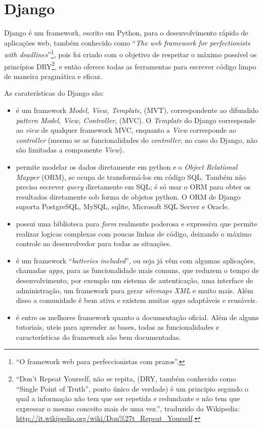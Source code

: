 \section{Django}\label{django}
Django é um framework, escrito em Python, para o desenvolvimento
rápido de aplicações web, também conhecido como ``\emph{The web
  framework for perfectionists with deadlines}''\footnote{``O
  framework web para perfeccionistas com prazos''.}, pois foi criado
com o objetivo de respeitar o máximo possível os princípios
DRY\footnote{``Don't Repeat Yourself, não se repita, (DRY, também
  conhecido como ``Single Point of Truth'', ponto único de verdade) é
  um principio segundo o qual a informação não tem que ser repetida e
  redundante e não tem que expressar o mesmo conceito mais de uma
  vez.'', traduzido do Wikipedia:
  \url{http://it.wikipedia.org/wiki/Don\%27t_Repeat_Yourself}.}, e
então oferece todas as ferramentas para escrever código limpo de
maneira pragmática e eficaz.

As caraterísticas do Django são:
\begin{itemize}
\item é um framework \emph{Model, View, Template}, (MVT),
  correspondente ao difundido \emph{pattern Model, View, Controller},
  (MVC). O \emph{Template} do Django corresponde ao \emph{view} de
  qualquer framework MVC, enquanto a \emph{View} corresponde ao
  \emph{controller} (mesmo se as funcionalidades do \emph{controller},
  no caso do Django, não são limitadas a componente \emph{View}).
\item permite modelar os dados diretamente em python e o
  \emph{Object Relational Mapper} (ORM), se ocupa de transformá-los em
  código SQL. Também não precisa escrever \emph{query} diretamente em
  SQL; é só usar o ORM para obter os resultados diretamente sob forma
  de objetos python. O ORM de Django suporta PostgreSQL, MySQL, sqlite,
  Microsoft SQL Server e Oracle.
\item possui uma biblioteca para \emph{form} realmente poderosa e
  expressiva que permite realizar logicas complexas com poucas linhas
  de código, deixando o máximo controle ao desenvolvedor para todas as
  situações.
\item é um framework ``\emph{batteries included}'', ou seja já vêm com
  algumas aplicações, chamadas \emph{apps}, para as funcionalidade
  mais comuns, que reduzem o tempo de desenvolvimento, por exemplo um
  sistema de autenticação, uma interface de administração, um
  framework para gerar \emph{sitemaps XML} e muito mais. Além disso a
  comunidade é bem ativa e existem muitas \emph{apps} adaptáveis e
  reusáveis.
\item é entre os melhores framework quanto a documentação
  oficial. Além de alguns tutoriais, uteis para aprender as bases,
  todas as funcionalidades e características do framework são bem
  documentadas.
\end{itemize}

